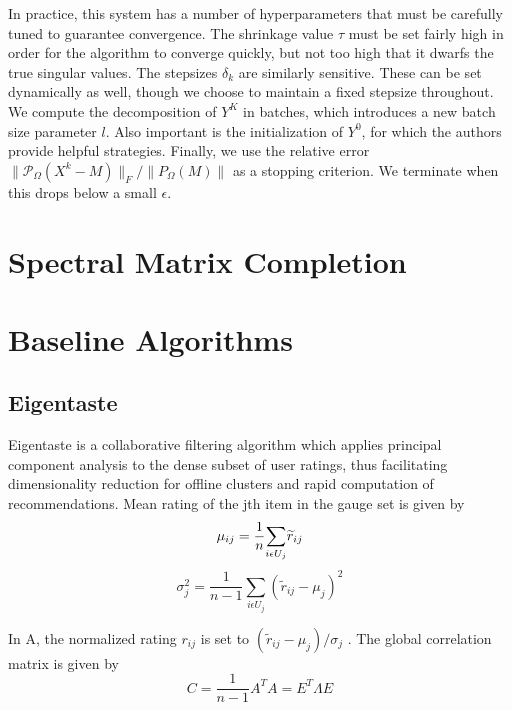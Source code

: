 \documentclass{article} %
\begin{document}
In practice, this system has a number of hyperparameters that must be
carefully tuned to guarantee convergence. The shrinkage value $\tau$
must be set fairly high in order for the algorithm to converge
quickly, but not too high that it dwarfs the true singular values. The
stepsizes $\delta_k$ are similarly sensitive. These can be set
dynamically as well, though we choose to maintain a fixed stepsize
throughout. We compute the decomposition of $Y^K$ in batches, which
introduces a new batch size parameter $l$. Also important is the
initialization of $Y^0$, for which the authors provide helpful
strategies. Finally, we use the relative error
$\|\mathcal{P}_{\Omega}(X^k-M)\|_F / \|P_{\Omega} (M)\|$ as a stopping
criterion. We terminate when this drops below a small $\epsilon$.

\section{Spectral Matrix Completion}




\section{Baseline Algorithms}

\subsection{Eigentaste}

Eigentaste is a collaborative filtering algorithm which applies
principal component analysis to the dense subset of user ratings, thus
facilitating dimensionality reduction for offline clusters and rapid
computation of recommendations. Mean rating of the jth item in the
gauge set is given by
\begin{equation*}
\mu_{ij}=\frac{1}{n}{\sum_{i\epsilon U_{j}}}\widetilde{r}_{ij}\\
\end{equation*}
\begin{equation*}
\sigma_j^2=\frac{1}{n-1}{\sum_{i\epsilon U_{j}}}({\widetilde{r}_{ij}-\mu_{j}})^{2}
\end{equation*}

In A, the normalized rating $r_{ij}$ is set to
$({\widetilde{r}_{ij}-\mu_{j}})/\sigma _{j}$ . The global correlation
matrix is given by
\begin{equation*}
C=\frac{1}{n-1}A^{T}A=E^{T} \Lambda E
\end{equation*}
\end{document}

